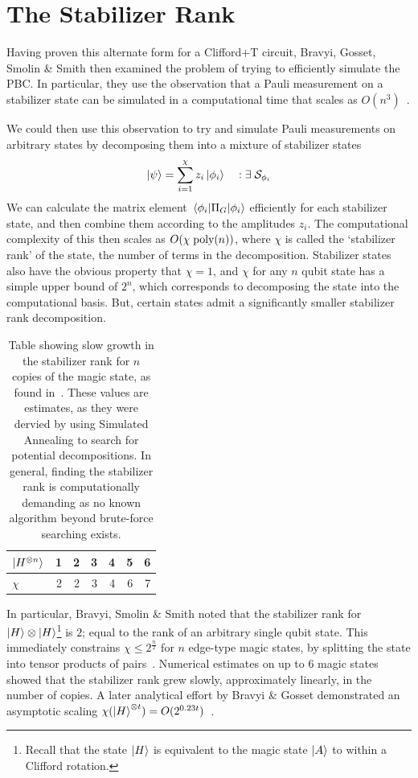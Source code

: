 \documentclass{standalone}
\begin{document}
\section{The Stabilizer Rank}\label{sec:srank}
Having proven this alternate form for a Clifford+T circuit, Bravyi, Gosset, Smolin \& Smith then examined the problem of trying to efficiently simulate the PBC. In particular, they use the observation that a Pauli measurement on a stabilizer state can be simulated in a computational time that scales as $O(n^{3})$~\cite{Aaronson2004a,Bravyi2015}. 
\par
We could then use this observation to try and simulate Pauli measurements on arbitrary states by decomposing them into a mixture of stabilizer states 
\begin{equation}
\ket{\psi} = \sum_{i=1}^{\chi}z_{i}\ket{\phi_{i}}\quad:\exists\;\mathcal{S}_{\phi_i}
\end{equation}
We can calculate the matrix element $\matrixel{\phi_{i}}{\Pi_{G}}{\phi_{i}}$ efficiently for each stabilizer state, and then combine them according to the amplitudes $z_{i}$. The computational complexity of this then scales as $O(\chi\;\text{poly}(n))$, where $\chi$ is called the `stabilizer rank' of the state, the number of terms in the decomposition. Stabilizer states also have the obvious property that $\chi=1$, and $\chi$ for any $n$ qubit state has a simple upper bound of $2^{n}$, which corresponds to decomposing the state into the computational basis. But, certain states admit a significantly smaller stabilizer rank decomposition.
\par
\begin{table}[h]
\centering
\begin{tabular}{||l|r|r|r|r|r|r||}
\hline
$\ket{H^{\otimes n}}$ & 1 & 2 & 3 & 4 & 5 & 6 \\ \hline
$\chi$ & 2 & 2 & 3 & 4 & 6 & 7\\ \hline
\end{tabular}
\caption{Table showing slow growth in the stabilizer rank for $n$ copies of the magic state, as found in~\cite{Bravyi2015}. These values are estimates, as they were dervied by using Simulated Annealing to search for potential decompositions. In general, finding the stabilizer rank is computationally demanding as no known algorithm beyond brute-force searching exists.}
\label{tab:approxchi}
\end{table}
In particular, Bravyi, Smolin \& Smith noted that the stabilizer rank for $\ket{H}\otimes\ket{H}$\footnote{Recall that the state $\ket{H}$ is equivalent to the magic state $\ket{A}$ to within a Clifford rotation.} is $2$; equal to the rank of an arbitrary single qubit state. This immediately constrains $\chi\leq 2^{\frac{n}{2}}$ for $n$ edge-type magic states, by splitting the state into tensor products of pairs~\cite{Bravyi2015}. Numerical estimates on up to 6 magic states showed that the stabilizer rank grew slowly, approximately linearly, in the number of copies. A later analytical effort by Bravyi \& Gosset demonstrated an asymptotic scaling $\chi(\ket{H}^{\otimes t})=O(2^{0.23 t})$~\cite{Bravyi2016b}.
\end{document}

